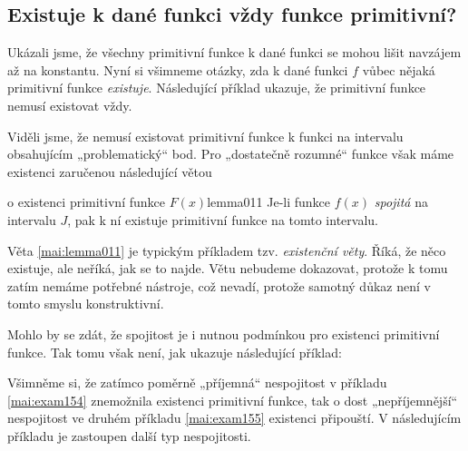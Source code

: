     \subsection{Existuje k dané funkci vždy funkce primitivní?}  
      Ukázali jsme, že všechny primitivní funkce k dané funkci se mohou lišit navzájem až na
      konstantu. Nyní si všimneme otázky, zda k dané funkci \(f\) vůbec nějaká primitivní funkce
      \emph{existuje}. Následující příklad ukazuje, že primitivní funkce nemusí existovat vždy.
      
      Viděli jsme, že nemusí existovat primitivní funkce k funkci na intervalu obsahujícím
      „problematický“ bod. Pro „dostatečně rozumné“ funkce však máme existenci zaručenou následující
      větou
      \begin{mathlemma}{o existenci primitivní funkce \(F(x)\)}{lemma011}         
        Je-li funkce \(f(x)\) \emph{spojitá} na intervalu \(J\), pak k ní existuje primitivní funkce
        na tomto intervalu.
      \end{mathlemma}
      Věta \eqref{mai:lemma011} je typickým příkladem tzv. \emph{existenční věty}. Říká, že něco
      existuje, ale neříká, jak se to najde. Větu nebudeme dokazovat, protože k tomu zatím nemáme
      potřebné nástroje, což nevadí, protože samotný důkaz není v tomto smyslu konstruktivní.
      
      Mohlo by se zdát, že spojitost je i nutnou podmínkou pro existenci primitivní funkce. Tak tomu
      však není, jak ukazuje následující příklad:
      
      Všimněme si, že zatímco poměrně „příjemná“ nespojitost v příkladu \eqref{mai:exam154}
      znemožnila existenci primitivní funkce, tak o dost „nepříjemnější“ nespojitost ve druhém
      příkladu \ref{mai:exam155} existenci připouští. V následujícím příkladu je zastoupen další
      typ nespojitosti.
      

